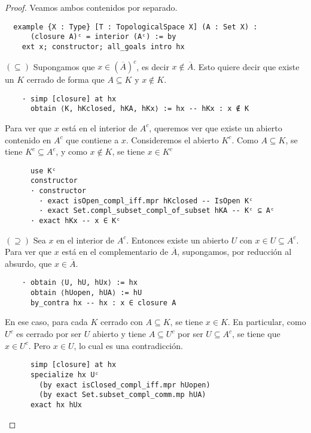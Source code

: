 \begin{proof}
  Veamos ambos contenidos por separado.

  \begin{lstlisting}
  example {X : Type} [T : TopologicalSpace X] (A : Set X) :
      (closure A)ᶜ = interior (Aᶜ) := by
    ext x; constructor; all_goals intro hx \end{lstlisting}
  
  $(\subseteq)$ Supongamos que $x \in (\overline{A})^c$, es decir $x \notin \overline{A}$. Esto quiere decir que existe un $K$ cerrado de forma que $A \subseteq K$ y $x \notin K$.

  \begin{lstlisting}
    · simp [closure] at hx
      obtain ⟨K, hKclosed, hKA, hKx⟩ := hx -- hKx : x ∉ K \end{lstlisting}
  
  Para ver que $x$ está en el interior de $A^c$, queremos ver que existe un abierto contenido en $A^c$ que contiene a $x$. Consideremos el abierto $K^c$. Como $A \subseteq K$, se tiene $K^c \subseteq A^c$, y como $x \notin K$, se tiene $x \in K^c$

  \begin{lstlisting}
      use Kᶜ 
      constructor
      · constructor
        · exact isOpen_compl_iff.mpr hKclosed -- IsOpen Kᶜ
        · exact Set.compl_subset_compl_of_subset hKA -- Kᶜ ⊆ Aᶜ
      · exact hKx -- x ∈ Kᶜ \end{lstlisting}

  $(\supseteq)$ Sea $x$ en el interior de $A^c$. Entonces existe un abierto $U$ con $x \in U \subseteq A^c$. Para ver que $x$ está en el complementario de $\overline{A}$, supongamos, por reducción al absurdo, que $x \in \overline{A}$.

  \begin{lstlisting}
    · obtain ⟨U, hU, hUx⟩ := hx
      obtain ⟨hUopen, hUA⟩ := hU
      by_contra hx -- hx : x ∈ closure A \end{lstlisting}

  En ese caso, para cada $K$ cerrado con $A \subseteq K$, se tiene $x \in K$. En particular, como $U^c$ es cerrado por ser $U$ abierto y tiene $A \subseteq U^c$ por ser $U \subseteq A^c$, se tiene que $x \in U^c$. Pero $x \in U$, lo cual es una contradicción.

  \begin{lstlisting}
      simp [closure] at hx
      specialize hx Uᶜ
        (by exact isClosed_compl_iff.mpr hUopen)
        (by exact Set.subset_compl_comm.mp hUA)
      exact hx hUx \end{lstlisting}
\end{proof}

